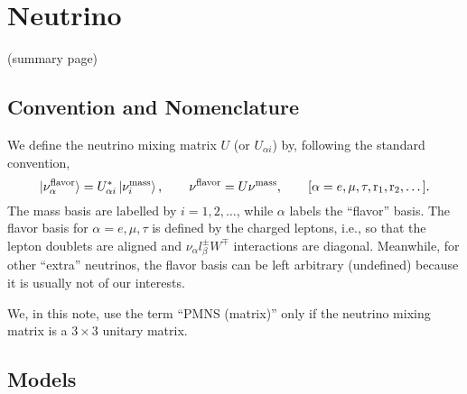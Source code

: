 \documentclass[CheatSheet]{subfiles}
\begin{document}
\summarystyle
\section{Neutrino}

(summary page)

\detailstyle
\clearpage
\subsection{Convention and Nomenclature}
We define the neutrino mixing matrix $U$ (or $U_{\alpha i}$) by, following the standard convention,
\begin{equation}
 \ket{\nu_\alpha^{\text{flavor}}} = U_{\alpha i}^*\ket{\nu_i^{\text{mass}}},
\qquad
 \nu^\text{flavor} = U \nu^{\text{mass}}, \qquad[\alpha=e,\mu,\tau,\mathrm{r}_1,\mathrm{r}_2,\dots].\label{eq:U-defining}
\end{equation}
The mass basis are labelled by $i=1,2,\dots$, while $\alpha$ labels the ``flavor'' basis.
The flavor basis for $\alpha=e,\mu,\tau$ is defined by the charged leptons, i.e., so that the lepton doublets are aligned and $\nu_\alpha l^\pm_\beta W^\mp$ interactions are diagonal.
Meanwhile, for other ``extra'' neutrinos, the flavor basis can be left arbitrary (undefined) because it is usually not of our interests.

We, in this note, use the term ``PMNS (matrix)'' only if the neutrino mixing matrix is a $3\times3$ unitary matrix.

\subsection{Models}
\end{document}
